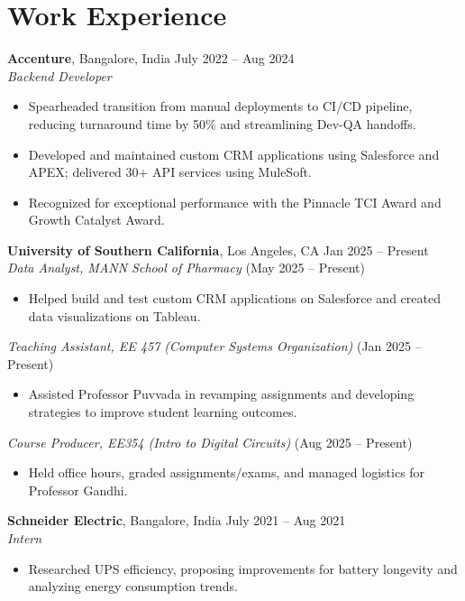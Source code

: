 \documentclass[letterpaper,10pt]{article}
\begin{document}
\section*{Work Experience}
\textbf{Accenture}, Bangalore, India \hfill July 2022 -- Aug 2024 \\
\textit{Backend Developer}
\begin{itemize} \itemsep -2pt
    \item Spearheaded transition from manual deployments to CI/CD pipeline, reducing turnaround time by 50\% and streamlining Dev-QA handoffs.
    \item Developed and maintained custom CRM applications using Salesforce and APEX; delivered 30+ API services using MuleSoft.
    \item Recognized for exceptional performance with the Pinnacle TCI Award and Growth Catalyst Award.
\end{itemize}

\vspace{-2pt}

\textbf{University of Southern California}, Los Angeles, CA \hfill Jan 2025 -- Present \\
\textit{Data Analyst, MANN School of Pharmacy} \hfill (May 2025 -- Present)
\begin{itemize} \itemsep -2pt
    \item Helped build and test custom CRM applications on Salesforce and created data visualizations on Tableau.
\end{itemize}
\textit{Teaching Assistant, EE 457 (Computer Systems Organization)} \hfill (Jan 2025 -- Present)
\begin{itemize} \itemsep -2pt
    \item Assisted Professor Puvvada in revamping assignments and developing strategies to improve student learning outcomes.
\end{itemize}
\textit{Course Producer, EE354 (Intro to Digital Circuits)} \hfill (Aug 2025 -- Present)
\begin{itemize} \itemsep -2pt
    \item Held office hours, graded assignments/exams, and managed logistics for Professor Gandhi.
\end{itemize}

\textbf{Schneider Electric}, Bangalore, India \hfill July 2021 -- Aug 2021 \\
\textit{Intern}
\begin{itemize} \itemsep -2pt
    \item Researched UPS efficiency, proposing improvements for battery longevity and analyzing energy consumption trends.
\end{itemize}
\end{document}
